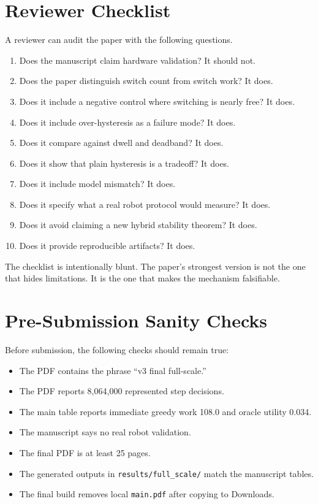 \documentclass{article}
\begin{document}
\section{Reviewer Checklist}

A reviewer can audit the paper with the following questions.

\begin{enumerate}
    \item Does the manuscript claim hardware validation? It should not.
    \item Does the paper distinguish switch count from switch work? It does.
    \item Does it include a negative control where switching is nearly free? It does.
    \item Does it include over-hysteresis as a failure mode? It does.
    \item Does it compare against dwell and deadband? It does.
    \item Does it show that plain hysteresis is a tradeoff? It does.
    \item Does it include model mismatch? It does.
    \item Does it specify what a real robot protocol would measure? It does.
    \item Does it avoid claiming a new hybrid stability theorem? It does.
    \item Does it provide reproducible artifacts? It does.
\end{enumerate}

The checklist is intentionally blunt.
The paper's strongest version is not the one that hides limitations.
It is the one that makes the mechanism falsifiable.

\section{Pre-Submission Sanity Checks}

Before submission, the following checks should remain true:

\begin{itemize}
    \item The PDF contains the phrase ``v3 final full-scale.''
    \item The PDF reports 8,064,000 represented step decisions.
    \item The main table reports immediate greedy work 108.0 and oracle utility 0.034.
    \item The manuscript says no real robot validation.
    \item The final PDF is at least 25 pages.
    \item The generated outputs in \texttt{results/full\_scale/} match the manuscript tables.
    \item The final build removes local \texttt{main.pdf} after copying to Downloads.
\end{itemize}
\end{document}
